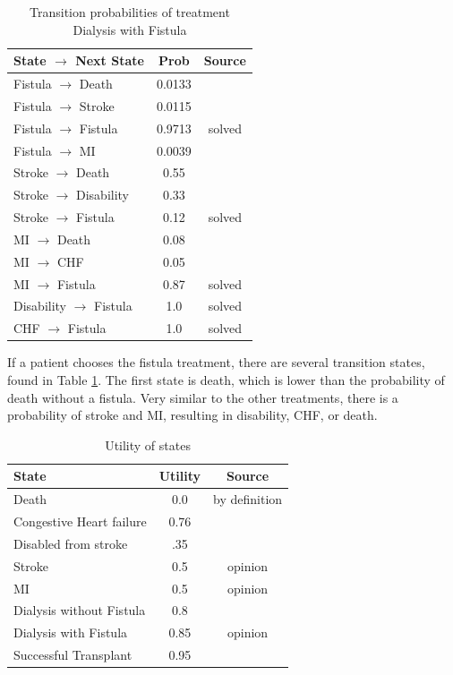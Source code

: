 \documentclass[10pt,twocolumn]{article}
\begin{document}
\begin{table}[ht]
  \centering
  \caption{Transition probabilities of treatment Dialysis with Fistula}
  \label{tab:trans4}
  \begin{tabularx}{\columnwidth}{X c c} 
      \toprule
 State \(\rightarrow\) Next State & Prob & Source \\ 
      \midrule
 Fistula \(\rightarrow\) Death & 0.0133 & \cite{ckdmodel} \\
 Fistula \(\rightarrow\) Stroke & 0.0115 & \cite{Stroke} \\
 Fistula \(\rightarrow\) Fistula & 0.9713 & solved \\
 Fistula \(\rightarrow\) MI & 0.0039 & \cite{long-term} \\

 Stroke \(\rightarrow\) Death & 0.55 & \cite{long-term} \\
 Stroke \(\rightarrow\) Disability & 0.33 & \cite{ckdmodel} \\
 Stroke \(\rightarrow\) Fistula & 0.12 & solved \\

 MI \(\rightarrow\) Death & 0.08 & \cite{ckdmodel} \\
 MI \(\rightarrow\) CHF & 0.05 & \cite{ckdmodel} \\
 MI \(\rightarrow\) Fistula & 0.87 & solved \\

 Disability \(\rightarrow\) Fistula & 1.0 & solved \\
 CHF \(\rightarrow\) Fistula & 1.0 & solved \\

      \bottomrule
  \end{tabularx}
\end{table}

If a patient chooses the fistula treatment, there are several transition states, found in Table \ref{tab:trans4}. The first state is death, which is lower than the probability of death without a fistula. Very similar to the other treatments, there is a probability of stroke and MI, resulting in disability, CHF, or death.

\begin{table}[ht]
  \centering
  \caption{Utility of states}
  \label{tab:infectiousness}
  \begin{tabularx}{\columnwidth}{X c c} 
      \toprule
 State & Utility & Source\\ 
      \midrule
 Death & 0.0 & by definition \\
 Congestive Heart failure & 0.76 & \cite{ckdmodel} \\
 Disabled from stroke & .35 & \cite{ckdmodel} \\
 Stroke & 0.5 & opinion\\
 MI & 0.5 & opinion\\
 Dialysis without Fistula & 0.8 & \cite{ckdmodel}\\
 Dialysis with Fistula & 0.85 & opinion\\
 Successful Transplant & 0.95 & \cite{ckdmodel}\\
      \bottomrule
  \end{tabularx}
\end{table}
\end{document}
